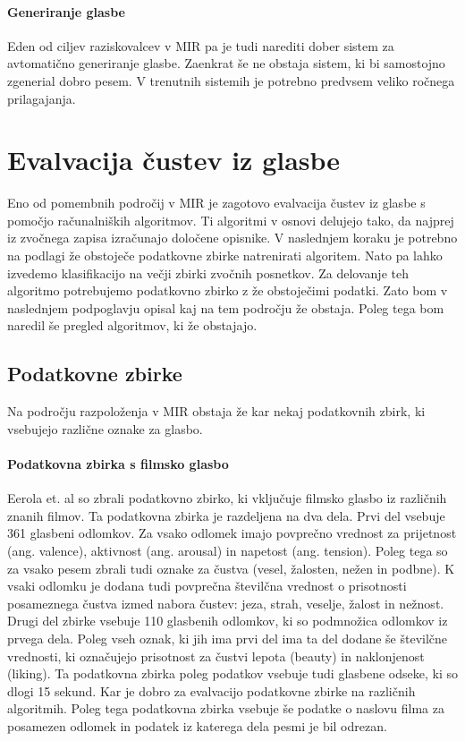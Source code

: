 \documentclass[a4paper, 12pt]{book}
\begin{document}
{\paragraph{Generiranje glasbe}

Eden od ciljev raziskovalcev v MIR pa je tudi narediti dober sistem za avtomatično generiranje glasbe. Zaenkrat še ne obstaja sistem, ki bi samostojno zgenerial dobro pesem. V trenutnih sistemih je potrebno predvsem veliko ročnega prilagajanja. 

\section{Evalvacija čustev iz glasbe}

Eno od pomembnih področij v MIR je zagotovo evalvacija čustev iz glasbe s pomočjo računalniških algoritmov. Ti algoritmi v osnovi delujejo tako, da najprej iz zvočnega zapisa izračunajo določene opisnike. V naslednjem koraku je potrebno na podlagi že obstoječe podatkovne zbirke natrenirati algoritem. Nato pa lahko izvedemo klasifikacijo na večji zbirki zvočnih posnetkov. Za delovanje teh algoritmo potrebujemo podatkovno zbirko z že obstoječimi podatki. Zato bom v naslednjem podpoglavju opisal kaj na tem področju že obstaja. Poleg tega bom naredil še pregled algoritmov, ki že obstajajo.

\subsection{Podatkovne zbirke}

Na področju razpoloženja v MIR obstaja že kar nekaj podatkovnih zbirk, ki vsebujejo različne oznake za glasbo. 

\paragraph{Podatkovna zbirka s filmsko glasbo}

Eerola et. al \cite{eerola2010comparison} so zbrali podatkovno zbirko, ki vključuje filmsko glasbo iz različnih znanih filmov. Ta podatkovna zbirka je razdeljena na dva dela. Prvi del vsebuje 361 glasbeni odlomkov. Za vsako odlomek imajo povprečno vrednost za prijetnost (ang. valence), aktivnost (ang. arousal) in  napetost (ang. tension). Poleg tega so za vsako pesem zbrali tudi oznake za čustva (vesel, žalosten, nežen in podbne). K vsaki odlomku je dodana tudi povprečna številčna vrednost o prisotnosti posameznega čustva izmed nabora čustev: jeza, strah, veselje, žalost in nežnost. Drugi del zbirke vsebuje 110 glasbenih odlomkov, ki so podmnožica odlomkov iz prvega dela. Poleg vseh oznak, ki jih ima prvi del ima ta del dodane še številčne vrednosti, ki označujejo prisotnost za čustvi lepota (beauty) in naklonjenost (liking). Ta podatkovna zbirka poleg podatkov vsebuje tudi glasbene odseke, ki so dlogi 15 sekund. Kar je dobro za evalvacijo podatkovne zbirke na različnih algoritmih. Poleg tega podatkovna zbirka vsebuje še podatke o naslovu filma za posamezen odlomek in podatek iz katerega dela pesmi je bil odrezan. 

}
\end{document}
